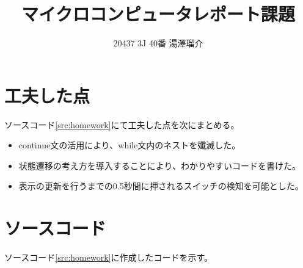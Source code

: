 \documentclass[a4j, dvipdfmx]{jsarticle}
\begin{document}
\title{マイクロコンピュータレポート課題}
\author{20437 3J 40番 湯澤瑠介}
\date{}

\maketitle

\section{工夫した点}
ソースコード\ref{src:homework}にて工夫した点を次にまとめる。
\begin{itemize}
	\item continue文の活用により、while文内のネストを殲滅した。
	\item 状態遷移の考え方を導入することにより、わかりやすいコードを書けた。
	\item 表示の更新を行うまでの0.5秒間に押されるスイッチの検知を可能とした。
\end{itemize}

\section{ソースコード}
ソースコード\ref{src:homework}に作成したコードを示す。

\end{document}

